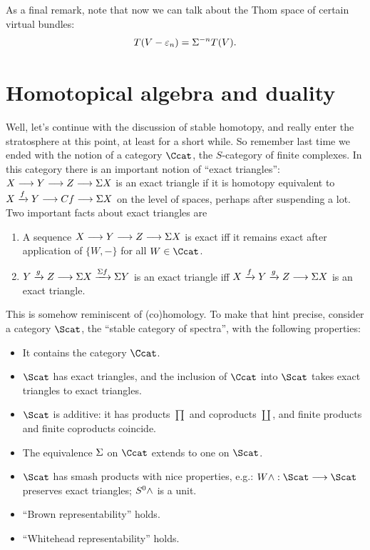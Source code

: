 As a final remark, note that now we can talk about the Thom space of certain virtual bundles: \[T(V - \varepsilon_n) = \Sigma^{-n} T(V).\]

\fi
\BoxedNote{}







\section{Homotopical algebra and duality} %
\label{HomotopicalAlgebraAndDuality}
\ifx\OutputHomotopicalAlgebraAndDuality\undefined\else
Well, let's continue with the discussion of stable homotopy, and really enter the stratosphere at this point, at least for a short while.  So remember last time we ended with the notion of a category $\Ccat$, the $S$-category of finite complexes.  In this category there is an important notion of ``exact triangles'': $X \longrightarrow Y \longrightarrow Z \longrightarrow \Sigma X$ is an exact triangle if it is homotopy equivalent to $X \xrightarrow{f} Y \longrightarrow Cf \longrightarrow \Sigma X$ on the level of spaces, perhaps after suspending a lot.  Two important facts about exact triangles are
\begin{enumerate}
\item A sequence $X \longrightarrow Y \longrightarrow Z \longrightarrow \Sigma X$ is exact iff it remains exact after application of $\{W, -\}$ for all $W \in \Ccat$.
\item $Y \xrightarrow{g} Z \longrightarrow \Sigma X \xrightarrow{\Sigma f} \Sigma Y$ is an exact triangle iff $X \xrightarrow{f} Y \xrightarrow{g} Z \longrightarrow \Sigma X$ is an exact triangle.
\end{enumerate}
This is somehow reminiscent of (co)homology. To make that hint precise, consider a category $\Scat$, the ``stable category of spectra'', with the following properties:
\begin{itemize}
\item It contains the category $\Ccat$.
\item $\Scat$ has exact triangles, and the inclusion of $\Ccat$ into $\Scat$ takes exact triangles to exact triangles.
\item $\Scat$ is additive: it has products $\prod$ and coproducts $\coprod$, and finite products and finite coproducts coincide.
\item The equivalence $\Sigma$ on $\Ccat$ extends to one on $\Scat$.
\item $\Scat$ has smash products with nice properties, e.g.: $W \sprod: \Scat \to \Scat$ preserves exact triangles; $S^0 \wedge$ is a unit.
\item ``Brown representability'' holds.
\item ``Whitehead representability'' holds.
\end{itemize}

